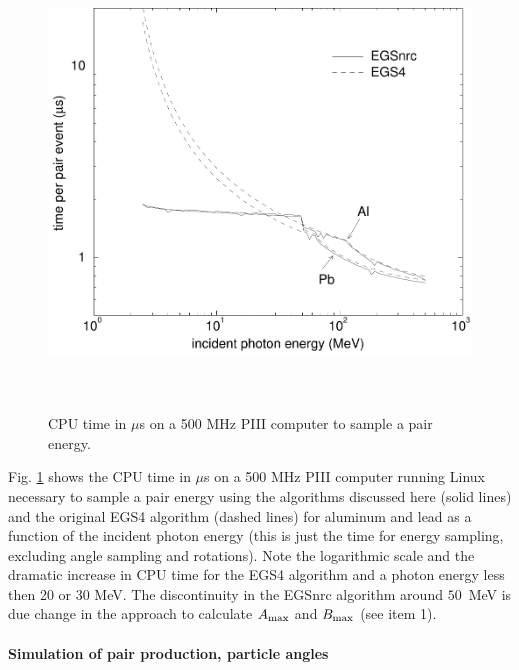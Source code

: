 \begin{figure}[h]
\includegraphics[height=12cm,width=12cm]{figures/pair_times}
\caption[CPU time for pair sampling]{\label{pair_times} 
CPU time in $\mu$s on a 500 MHz PIII computer to sample a pair energy.}
\end{figure}

Fig. \ref{pair_times} shows the CPU time in $\mu$s on a 500 MHz PIII computer 
running Linux necessary to sample a pair energy using the 
algorithms discussed here (solid lines) and the original EGS4 
algorithm (dashed lines) for aluminum and lead as a function 
of the incident photon energy (this is just the time for 
energy sampling, excluding angle sampling and rotations). Note 
the logarithmic scale and the dramatic increase in CPU time for 
the EGS4 algorithm and a photon energy less then 20 or 30 MeV. 
The discontinuity in the EGSnrc algorithm around $50$~MeV 
is due change in the 
approach to calculate $A_{\rm max}$ and $B_{\rm max}$  (see item 1).

\paragraph{Simulation of pair production, particle angles}\hfill
{}

